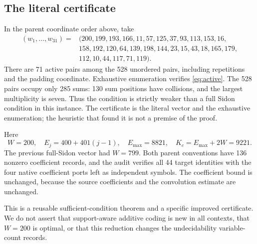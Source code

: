 \subsection{The literal certificate}
In the parent coordinate order above, take
\begin{equation}\label{eq:weightsnew}
\begin{split}
(w_1,\ldots,w_{31})={}&(200,199,193,166,11,57,125,37,93,113,153,16,\\
&158,192,120,64,139,198,144,23,15,43,18,165,179,\\
&112,10,44,117,71,119).
\end{split}
\end{equation}
There are 71 active pairs among the 528 unordered pairs, including
repetitions and the padding coordinate. Exhaustive enumeration verifies
\eqref{eq:active}. The 528 pairs occupy only 285 sums: 130 sum positions
have collisions, and the largest multiplicity is seven. Thus the
condition is strictly weaker than a full Sidon condition in this instance.
The certificate is the literal vector and the exhaustive enumeration;
the heuristic that found it is not a premise of the proof.

Here
\[
 W=200,\quad E_j=400+401(j-1),\quad
 E_{\max}=8821,\quad K_c=E_{\max}+2W=9221.
\]
The previous full-Sidon vector had $W=799$. Both parent conventions have
136 nonzero coefficient records, and the audit verifies all 44 target
identities with the four native coefficient ports left as independent
symbols. The coefficient bound is unchanged, because the source
coefficients and the convolution estimate are unchanged.

This is a reusable sufficient-condition theorem and a specific improved
certificate. We do not assert that support-aware additive coding is new
in all contexts, that $W=200$ is optimal, or that this reduction changes
the undecidability variable-count records.
